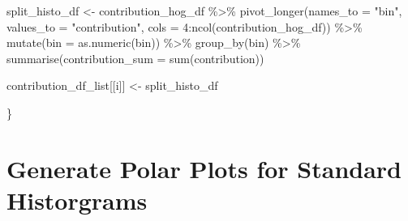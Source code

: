\documentclass[
  letterpaper,
  DIV=11,
  numbers=noendperiod]{scrreprt}
\newenvironment{Shaded}{\begin{snugshade}}{\end{snugshade}}
\newcommand{\AttributeTok}[1]{\textcolor[rgb]{0.40,0.45,0.13}{#1}}
\newcommand{\DecValTok}[1]{\textcolor[rgb]{0.68,0.00,0.00}{#1}}
\newcommand{\FunctionTok}[1]{\textcolor[rgb]{0.28,0.35,0.67}{#1}}
\newcommand{\NormalTok}[1]{\textcolor[rgb]{0.00,0.23,0.31}{#1}}
\newcommand{\OtherTok}[1]{\textcolor[rgb]{0.00,0.23,0.31}{#1}}
\newcommand{\SpecialCharTok}[1]{\textcolor[rgb]{0.37,0.37,0.37}{#1}}
\newcommand{\StringTok}[1]{\textcolor[rgb]{0.13,0.47,0.30}{#1}}
\begin{document}
\begin{Shaded}
\begin{Highlighting}[]
\NormalTok{  split\_histo\_df }\OtherTok{\textless{}{-}} 
\NormalTok{    contribution\_hog\_df }\SpecialCharTok{\%\textgreater{}\%}
    \FunctionTok{pivot\_longer}\NormalTok{(}\AttributeTok{names\_to =} \StringTok{"bin"}\NormalTok{, }
                 \AttributeTok{values\_to =} \StringTok{"contribution"}\NormalTok{, }
                 \AttributeTok{cols =} \DecValTok{4}\SpecialCharTok{:}\FunctionTok{ncol}\NormalTok{(contribution\_hog\_df)) }\SpecialCharTok{\%\textgreater{}\%}
    \FunctionTok{mutate}\NormalTok{(}\AttributeTok{bin =} \FunctionTok{as.numeric}\NormalTok{(bin)) }\SpecialCharTok{\%\textgreater{}\%}
    \FunctionTok{group\_by}\NormalTok{(bin) }\SpecialCharTok{\%\textgreater{}\%}
    \FunctionTok{summarise}\NormalTok{(}\AttributeTok{contribution\_sum =} \FunctionTok{sum}\NormalTok{(contribution))}
  
  
\NormalTok{  contribution\_df\_list[[i]] }\OtherTok{\textless{}{-}}\NormalTok{ split\_histo\_df}

\NormalTok{\}}
\end{Highlighting}
\end{Shaded}

\hypertarget{generate-polar-plots-for-standard-historgrams}{%
\section{Generate Polar Plots for Standard
Historgrams}\label{generate-polar-plots-for-standard-historgrams}}
\end{document}
